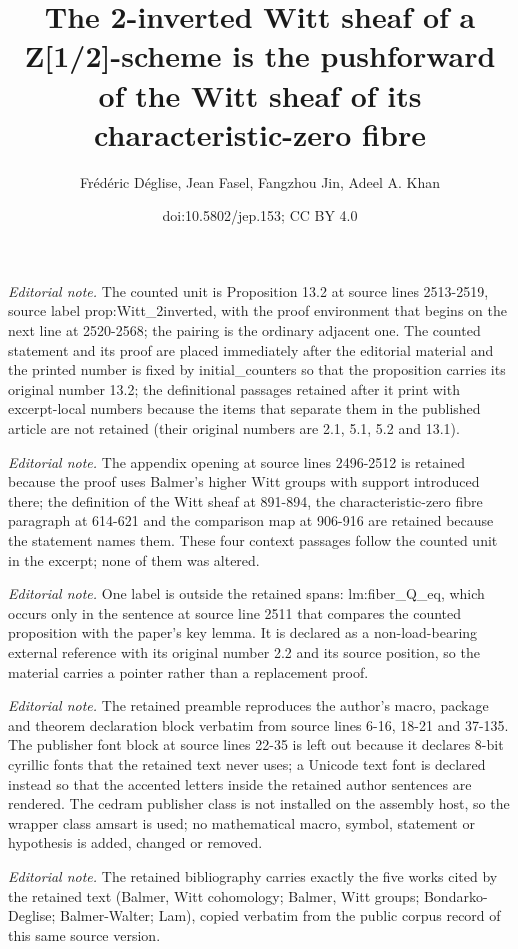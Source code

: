 \documentclass[10pt,a4paper]{amsart}
\title{The 2-inverted Witt sheaf of a Z[1/2]-scheme is the pushforward of the Witt sheaf of its characteristic-zero fibre}
\author{Frédéric Déglise, Jean Fasel, Fangzhou Jin, Adeel A. Khan}
\date{doi:10.5802/jep.153; CC BY 4.0}
\theoremstyle{remark}
\theoremstyle{definition}
\numberwithin{equation}{thm}
\begin{document}
\maketitle
\setcounter{section}{13}
\setcounter{thm}{1}
\noindent\textit{Editorial note.} The counted unit is Proposition 13.2 at source lines 2513-2519, source label prop:Witt\_2inverted, with the proof environment that begins on the next line at 2520-2568; the pairing is the ordinary adjacent one. The counted statement and its proof are placed immediately after the editorial material and the printed number is fixed by initial\_counters so that the proposition carries its original number 13.2; the definitional passages retained after it print with excerpt-local numbers because the items that separate them in the published article are not retained (their original numbers are 2.1, 5.1, 5.2 and 13.1).\par\medskip
\noindent\textit{Editorial note.} The appendix opening at source lines 2496-2512 is retained because the proof uses Balmer's higher Witt groups with support introduced there; the definition of the Witt sheaf at 891-894, the characteristic-zero fibre paragraph at 614-621 and the comparison map at 906-916 are retained because the statement names them. These four context passages follow the counted unit in the excerpt; none of them was altered.\par\medskip
\noindent\textit{Editorial note.} One label is outside the retained spans: lm:fiber\_Q\_eq, which occurs only in the sentence at source line 2511 that compares the counted proposition with the paper's key lemma. It is declared as a non-load-bearing external reference with its original number 2.2 and its source position, so the material carries a pointer rather than a replacement proof.\par\medskip
\noindent\textit{Editorial note.} The retained preamble reproduces the author's macro, package and theorem declaration block verbatim from source lines 6-16, 18-21 and 37-135. The publisher font block at source lines 22-35 is left out because it declares 8-bit cyrillic fonts that the retained text never uses; a Unicode text font is declared instead so that the accented letters inside the retained author sentences are rendered. The cedram publisher class is not installed on the assembly host, so the wrapper class amsart is used; no mathematical macro, symbol, statement or hypothesis is added, changed or removed.\par\medskip
\noindent\textit{Editorial note.} The retained bibliography carries exactly the five works cited by the retained text (Balmer, Witt cohomology; Balmer, Witt groups; Bondarko-Deglise; Balmer-Walter; Lam), copied verbatim from the public corpus record of this same source version.\par\medskip
\end{document}
